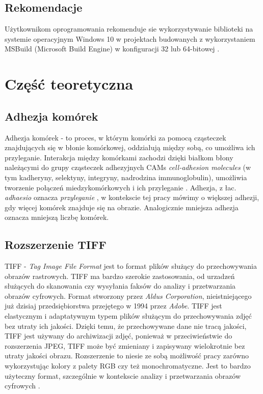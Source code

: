 \documentclass{article}
\begin{document}
        \subsection{Rekomendacje}
        {
            \Large
            \justifying
            \quad
            Użytkownikom oprogramowania rekomenduje sie wykorzystywanie biblioteki na systemie operacyjnym Windows 10 w projektach budowanych z wykorzystaniem MSBuild (Microsoft Build Engine) w konfiguracji 32 lub 64-bitowej \cite{msdocsmsbuild}.
        }

    \section{Część teoretyczna}
        \subsection{Adhezja komórek}
        {
            \label{sec:adhezja-komorek}
            \Large
            \justifying
            \quad
            Adhezja komórek - to proces, w którym komórki za pomocą cząsteczek znajdujących się w błonie komórkowej, oddziałują między sobą, co umożliwa ich przyleganie.
            Interakcja między komórkami zachodzi dzięki białkom błony należącymi do grupy cząsteczek adhezyjnych CAMs \textit{cell-adhesion molecules} (w tym kadheryny, selektyny, integryny, nadrodzina immunoglobulin), umożliwia tworzenie połączeń miedzykomórkowych i ich przyleganie
            \cite{Molecular Biology of the Cell. 4th edition}.
            Adhezja, z łac. \textit {adhaesio} oznacza \textit{przyleganie} \cite{adhezja}, w kontekscie tej pracy mówimy o większej adhezji, gdy więcej komórek znajduje się na obrazie.
            Analogicznie mniejsza adhezja oznacza mniejszą liczbę komórek.
        }
        \subsection{Rozszerzenie TIFF}
        {
            \label{sec:rozszerzenie-tiff}
            \Large
            \justifying
            \quad
            TIFF - \textit{Tag Image File Format} jest to format plików służący do przechowywania obrazów rastrowych.
            TIFF ma bardzo szerokie zastosowania, od urzadzeń służących do skanowania czy wysyłania faksów do analizy i przetwarzania obrazów cyfrowych.
            Format stworzony przez \textit{Aldus Corporation}, nieistniejącego już dzisiaj przedsiębiorstwa przejętego w 1994 przez \textit{Adobe}.
            TIFF jest elastycznym i adaptatywnym typem plików służącym do przechowywania zdjęć bez utraty ich jakości.
            Dzięki temu, że przechowywane dane nie tracą jakości, TIFF jest używany do archiwizacji zdjęć, ponieważ w przeciwieństwie do rozszerzenia JPEG,
            TIFF może być zmieniany i zapisywany wielokrotnie bez utraty jakości obrazu.
            Rozszerzenie to niesie ze sobą możliwość pracy zarówno wykorzystując kolory z palety RGB czy też monochromatyczne.
            Jest to bardzo użyteczny format, szczególnie w kontekscie analizy i przetwarzania obrazów cyfrowych \cite{Encyclopedia of Graphics File Formats: The Complete Reference}.
        }
\end{document}
